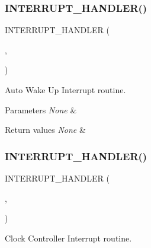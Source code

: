 \subsubsection{\texorpdfstring{I\+N\+T\+E\+R\+R\+U\+P\+T\+\_\+\+H\+A\+N\+D\+L\+E\+R()}{INTERRUPT\_HANDLER()}\hspace{0.1cm}{\footnotesize\ttfamily [2/16]}}
{\footnotesize\ttfamily I\+N\+T\+E\+R\+R\+U\+P\+T\+\_\+\+H\+A\+N\+D\+L\+ER (\begin{DoxyParamCaption}\item[{A\+W\+U\+\_\+\+I\+R\+Q\+Handler}]{,  }\item[{1}]{ }\end{DoxyParamCaption})}



Auto Wake Up Interrupt routine. 


\begin{DoxyParams}{Parameters}
{\em None} & \\
\hline
\end{DoxyParams}

\begin{DoxyRetVals}{Return values}
{\em None} & \\
\hline
\end{DoxyRetVals}
\mbox{\label{group___u_a_r_t1___printf_ga8b447af5c4868260f054f611c31c32b8}} 
\subsubsection{\texorpdfstring{I\+N\+T\+E\+R\+R\+U\+P\+T\+\_\+\+H\+A\+N\+D\+L\+E\+R()}{INTERRUPT\_HANDLER()}\hspace{0.1cm}{\footnotesize\ttfamily [3/16]}}
{\footnotesize\ttfamily I\+N\+T\+E\+R\+R\+U\+P\+T\+\_\+\+H\+A\+N\+D\+L\+ER (\begin{DoxyParamCaption}\item[{C\+L\+K\+\_\+\+I\+R\+Q\+Handler}]{,  }\item[{2}]{ }\end{DoxyParamCaption})}



Clock Controller Interrupt routine. 


